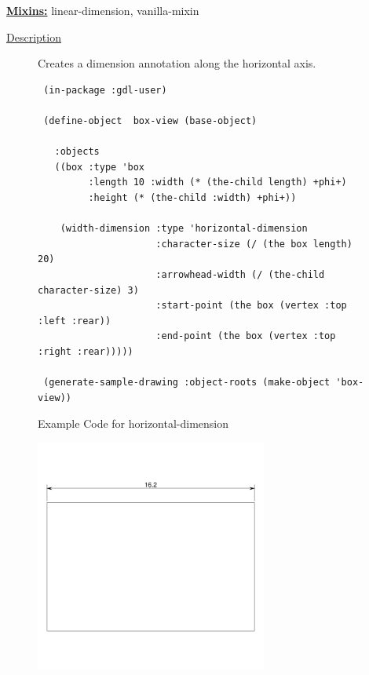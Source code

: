 \documentclass [11pt]{book}
\begin{document}
\begin{itemize}
\textbf{
\underline{Mixins:}} linear-dimension, vanilla-mixin





\begin{description}

\item [
\underline{Description}]


Creates a dimension annotation along the horizontal axis.



\end{description}




\begin{figure}
\begin{lrbox}{\boxedverb}
\begin{minipage}{\linewidth}
{\small

\begin{verbatim}          
 (in-package :gdl-user)

 (define-object  box-view (base-object)
   
   :objects
   ((box :type 'box
         :length 10 :width (* (the-child length) +phi+)
         :height (* (the-child :width) +phi+))
   
    (width-dimension :type 'horizontal-dimension
                     :character-size (/ (the box length) 20)
                     :arrowhead-width (/ (the-child character-size) 3)
                     :start-point (the box (vertex :top :left :rear))
                     :end-point (the box (vertex :top :right :rear)))))

 (generate-sample-drawing :object-roots (make-object 'box-view)) 
\end{verbatim}}
\end{minipage}
\end{lrbox}
\fbox{\usebox{\boxedverb}}

\caption{Example Code for horizontal-dimension}

\label{fig:example-code-horizontal-dimension}

\end{figure}

\begin{figure}
\begin{center}
\includegraphics[width=3in,height=3in]{../images/example-horizontal-dimension.pdf}
\end{center}


\end{figure}
\end{itemize}
\end{document}
